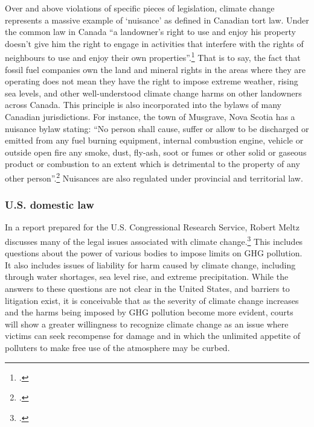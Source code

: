 Over and above violations of specific pieces of legislation, climate change represents a massive example of `nuisance' as defined in Canadian tort law.
Under the common law in Canada ``a landowner's right to use and enjoy his property doesn't give him the right to engage in activities that interfere with the rights of neighbours to use and enjoy their own properties''.\footcite[][]{NuisancesInsider}
That is to say, the fact that fossil fuel companies own the land and mineral rights in the areas where they are operating does not mean they have the right to impose extreme weather, rising sea levels, and other well-understood climate change harms on other landowners across Canada.
This principle is also incorporated into the bylaws of many Canadian jurisdictions.
For instance, the town of Musgrave, Nova Scotia has a nuisance bylaw stating: ``No person shall cause, suffer or allow to be discharged or emitted from any fuel burning equipment, internal combustion engine, vehicle or outside open fire any smoke, dust, fly-ash, soot or fumes or other solid or gaseous product or combustion to an extent which is detrimental to the property of any other person''.\footcite[][]{NuisancesInsider}
Nuisances are also regulated under provincial and territorial law.



		\subsubsection{U.S. domestic law}



In a report prepared for the U.S. Congressional Research Service, Robert Meltz discusses many of the legal issues associated with climate change.\footcite[][]{ExistingLaw}
This includes questions about the power of various bodies to impose limits on GHG pollution.
It also includes issues of liability for harm caused by climate change, including through water shortages, sea level rise, and extreme precipitation.
While the answers to these questions are not clear in the United States, and barriers to litigation exist, it is conceivable that as the severity of climate change increases and the harms being imposed by GHG pollution become more evident, courts will show a greater willingness to recognize climate change as an issue where victims can seek recompense for damage and in which the unlimited appetite of polluters to make free use of the atmosphere may be curbed.



